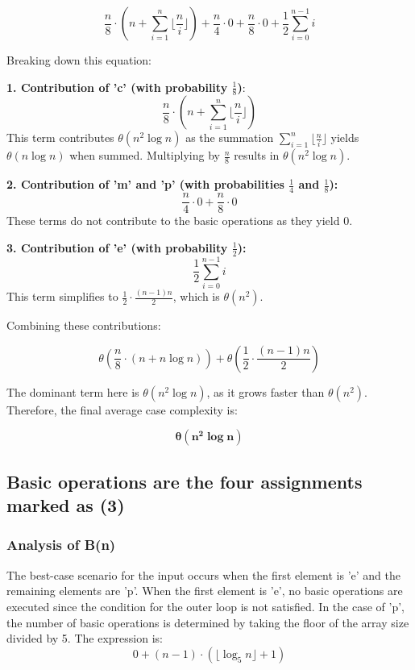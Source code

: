 \documentclass[11pt, oneside, a4paper]{article}
\begin{document}
\begin{equation*}
\frac{n}{8} \cdot \left( n +  \sum_{i=1}^{n} \lfloor \frac{n}{i} \rfloor \right) + \frac{n}{4} \cdot 0 + \frac{n}{8} \cdot 0 + \frac{1}{2} \sum_{i=0}^{n-1} i
\end{equation*}

Breaking down this equation: 

 \textbf {1. Contribution of 'c' (with probability \(\frac{1}{8}\))}:
   \[
   \frac{n}{8} \cdot \left( n +  \sum_{i=1}^{n} \lfloor \frac{n}{i} \rfloor \right)\]
   This term contributes \(\theta(n^2 \log n)\) as the summation \(\sum_{i=1}^{n} \lfloor \frac{n}{i} \rfloor\) yields \(\theta(n \log n)\)  when summed. Multiplying by \( \frac{n}{8} \) results in \(\theta(n^2 \log n)\).

 \textbf{2. Contribution of 'm' and 'p' (with probabilities \(\frac{1}{4}\) and \(\frac{1}{8}\)):}
   \[\frac{n}{4} \cdot 0 + \frac{n}{8} \cdot 0 \]
   These terms do not contribute to the basic operations as they yield 0. 

\textbf{3. Contribution of 'e' (with probability \(\frac{1}{2}\)):}
   \[
   \frac{1}{2} \sum_{i=0}^{n-1} i
   \]
   This term simplifies to \(\frac{1}{2} \cdot \frac{(n-1)n}{2}\), which is \(\theta(n^2)\).

Combining these contributions:

\[
\theta\left(\frac{n}{8} \cdot (n + n \log n)\right) + \theta\left(\frac{1}{2} \cdot \frac{(n-1)n}{2}\right)
\]

The dominant term here is \(\theta(n^2 \log n)\), as it grows faster than \(\theta(n^2)\). Therefore, the final average case complexity is:

\[
\boldsymbol{\theta(n^2 \log n)}
\]


	\subsection{Basic operations are the four assignments marked as (3)}

\subsubsection{Analysis of B(n)}

The best-case scenario for the input occurs when the first element is 'e' and the remaining elements are 'p'. When the first element is 'e', no basic operations are executed since the condition for the outer loop is not satisfied. In the case of 'p', the number of basic operations is determined by taking the floor of the array size divided by 5. The expression is:
\begin{equation*}
0 + (n-1) \cdot \left( \lfloor \log_5 n \rfloor + 1 \right)
\end{equation*}
\end{document}
